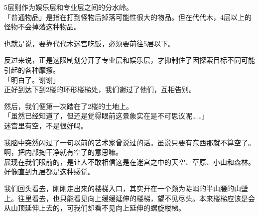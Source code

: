 5层则作为娱乐层和专业层之间的分水岭。\\

「普通物品」是指在打到怪物后掉落可能性很大的物品。但在代代木，4层以上的怪物不会掉落这种物品。

也就是说，要靠代代木迷宫吃饭，必须要前往5层以下。

反过来说，正是这限制划分开了专业层和娱乐层，才抑制住了因探索目标不同可能引起的各种摩擦。\\

「明白了。谢谢」\\

正好到达下到2楼的环形楼梯处，我们谢过了他们，互相告别。

然后，我们便第一次踏在了2楼的土地上。\\

「虽然已经知道了，但还是觉得眼前这景象实在是不可思议呢……」\\

迷宫里有空，不是很好吗。

我脑中突然闪过了一句以前的艺术家曾说过的话。虽说只要有东西那就不算空了。啊，把内部掏干净就有空了的意思嘛。\\

展现在我们眼前的，是让人不敢相信这是在迷宫之中的天空、草原、小山和森林。好像直到九层都是这种感觉。

我们回头看去，刚刚走出来的楼梯入口，其实开在一个颇为陡峭的半山腰的山壁上。往里看去，也只能看见向上缓缓延伸的楼梯，望不见尽头。本来楼梯应该是会从山顶延伸上去的，可我们却看不见向上延伸的螺旋楼梯。\\

